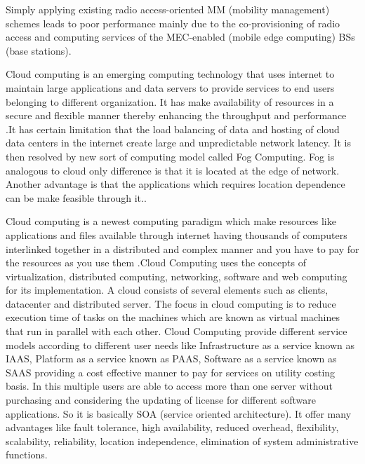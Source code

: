 Simply applying existing radio access-oriented
MM (mobility management) schemes leads to poor performance mainly due to the
co-provisioning of radio access and computing services of the
MEC-enabled (mobile edge computing) BSs (base stations).


Cloud computing is an emerging computing technology that uses internet to maintain large
applications and data servers to provide services to end users belonging to different organization. It has make
availability of resources in a secure and flexible manner thereby enhancing the throughput and performance .It
has certain limitation that the load balancing of data and hosting of cloud data centers in the internet create large
and unpredictable network latency. It is then resolved by new sort of computing model called Fog Computing.
Fog is analogous to cloud only difference is that it is located at the edge of network. Another advantage is that
the applications which requires location dependence can be make feasible through it..

Cloud computing is a newest computing paradigm which make resources like applications and files available
through internet having thousands of computers interlinked together in a distributed and complex manner and
you have to pay for the resources as you use them .Cloud Computing uses the concepts of virtualization,
distributed computing, networking, software and web computing for its implementation. A cloud consists of
several elements such as clients, datacenter and distributed server. The focus in cloud computing is to reduce
execution time of tasks on the machines which are known as virtual machines that run in parallel with each
other. Cloud Computing provide different service models according to different user needs like Infrastructure as
a service known as IAAS, Platform as a service known as PAAS, Software as a service known as SAAS
providing a cost effective manner to pay for services on utility costing basis. In this multiple users are able to
access more than one server without purchasing and considering the updating of license for different software
applications. So it is basically SOA (service oriented architecture). It offer many advantages like fault tolerance,
high availability, reduced overhead, flexibility, scalability, reliability, location independence, elimination of
system administrative functions.



